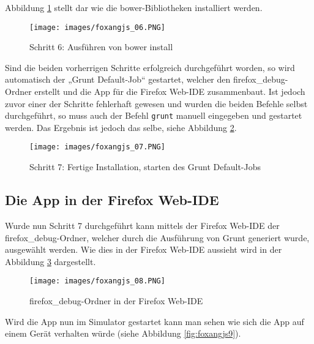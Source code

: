 Abbildung \ref{fig:foxangjs6} stellt dar wie die bower-Bibliotheken installiert werden. \\

\begin{figure}[!ht]
  \centering
    \texttt{[image: images/foxangjs\_06.PNG]}\\
  \caption{Schritt 6: Ausführen von bower install}
  \label{fig:foxangjs6}
\end{figure}

Sind die beiden vorherrigen Schritte erfolgreich durchgeführt worden, so wird automatisch der „Grunt Default-Job“ gestartet, welcher den firefox\_debug-Ordner erstellt und die App für die Firefox Web-IDE zusammenbaut.
Ist jedoch zuvor einer der Schritte fehlerhaft gewesen und wurden die beiden Befehle selbst durchgeführt, so muss auch der Befehl \texttt{grunt} manuell eingegeben und gestartet werden.
Das Ergebnis ist jedoch das selbe, siehe Abbildung \ref{fig:foxangjs7}.

\begin{figure}[!ht]
  \centering
    \texttt{[image: images/foxangjs\_07.PNG]}\\
  \caption{Schritt 7: Fertige Installation, starten des Grunt Default-Jobs}
  \label{fig:foxangjs7}
\end{figure}

\subsection{Die App in der Firefox Web-IDE}

Wurde nun Schritt 7 durchgeführt kann mittels der Firefox Web-IDE der firefox\_debug-Ordner, welcher durch die Ausführung von Grunt generiert wurde, ausgewählt werden.
Wie dies in der Firefox Web-IDE aussieht wird in der Abbildung \ref{fig:foxangjs8} dargestellt. \\

\begin{figure}[!ht]
  \centering
    \texttt{[image: images/foxangjs\_08.PNG]}\\
  \caption{firefox\_debug-Ordner in der Firefox Web-IDE}
  \label{fig:foxangjs8}
\end{figure}

Wird die App nun im Simulator gestartet kann man sehen wie sich die App auf einem Gerät verhalten würde (siehe Abbildung \ref{fig:foxangjs9}). \\

